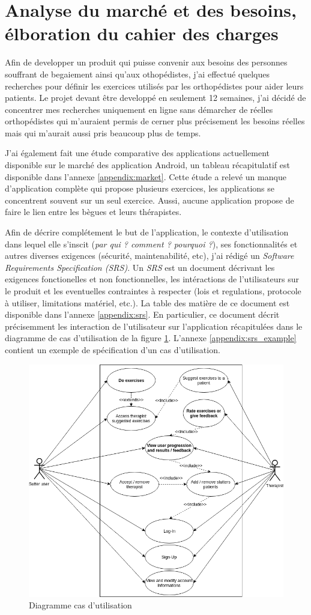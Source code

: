 \section{Analyse du marché et des besoins, élboration du cahier des charges}
Afin de developper un produit qui puisse convenir aux besoins des personnes souffrant de begaiement ainsi qu'aux othopédistes, j'ai effectué quelques recherches pour définir les exercices utilisés par les orthopédistes pour aider leurs patients. Le projet devant être developpé en seulement 12 semaines, j'ai décidé de concentrer mes recherches uniquement en ligne sans démarcher de réelles orthopédistes qui m'auraient permis de cerner plus précisement les besoins réelles mais qui m'aurait aussi pris beaucoup plus de temps.

J'ai également fait une étude comparative des applications actuellement disponible sur le marché des application Android, un tableau récapitulatif est disponible dans l'annexe \ref{appendix:market}. Cette étude a relevé un manque d'application complète qui propose plusieurs exercices, les applications se concentrent souvent sur un seul exercice. Aussi, aucune application propose de faire le lien entre les bègues et leurs thérapistes.

Afin de décrire complétement le but de l'application, le contexte d'utilisation dans lequel elle s'inscit (\textit{par qui ? comment ? pourquoi ?}), ses fonctionnalités et autres diverses exigences (sécurité, maintenabilité, etc),  j'ai rédigé un \textit{Software Requirements Specification (SRS)}. Un \textit{SRS} est un document décrivant les exigences fonctionelles et non fonctionnelles, les intéractions de l'utilisateurs sur le produit et les eventuelles contraintes à respecter (lois et regulations, protocole à utiliser, limitations matériel, etc.). La table des matière de ce document est disponible dans l'annexe \ref{appendix:srs}. En particulier, ce document décrit précisemment les interaction de l'utilisateur sur l'application récapitulées dans le diagramme de cas d'utilisation de la figure \ref{fig:srs}. L'annexe \ref{appendix:srs_example} contient un exemple de spécification d'un cas d'utilisation.



\begin{figure}
  \includegraphics[width=.9\linewidth]{content/imgs/usecase.png}
  \caption{Diagramme cas d'utilisation}
  \label{fig:srs}
\end{figure}
